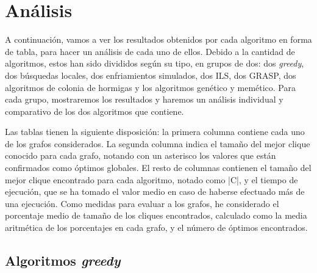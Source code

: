 \section{Análisis}

A continuación, vamos a ver los resultados obtenidos por cada algoritmo en forma de tabla,
para hacer un análisis de cada uno de ellos. Debido a la cantidad de algoritmos, estos
han sido divididos según su tipo, en grupos de dos: dos \textit{greedy}, dos búsquedas
locales, dos enfriamientos simulados, dos ILS, dos GRASP, dos algoritmos de colonia de
hormigas y los algoritmos genético y memético. Para cada grupo, mostraremos los resultados
y haremos un análisis individual y comparativo de los dos algoritmos que contiene.

Las tablas tienen la siguiente disposición: la primera columna contiene cada uno de los
grafos considerados. La segunda columna indica el tamaño del mejor clique conocido para
cada grafo, notando con un asterisco los valores que están confirmados como óptimos
globales. El resto de columnas contienen el tamaño del mejor clique encontrado para cada
algoritmo, notado como |C|, y el tiempo de ejecución, que se ha tomado el valor medio en
caso de haberse efectuado más de una ejecución. Como medidas para evaluar a los grafos,
he considerado el porcentaje medio de tamaño de los cliques encontrados, calculado como
la media aritmética de los porcentajes en cada grafo, y el número de óptimos encontrados.

\subsection{Algoritmos \textit{greedy}}

